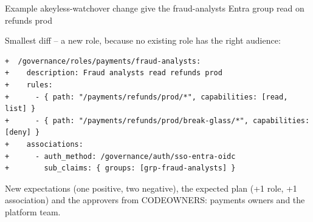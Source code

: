 \begin{session}{Example}
\you akeyless-watchover change give the fraud-analysts Entra group read on refunds prod

\agent Smallest diff -- a new role, because no existing role has the right audience:
\begin{lstlisting}
+  /governance/roles/payments/fraud-analysts:
+    description: Fraud analysts read refunds prod
+    rules:
+      - { path: "/payments/refunds/prod/*", capabilities: [read, list] }
+      - { path: "/payments/refunds/prod/break-glass/*", capabilities: [deny] }
+    associations:
+      - auth_method: /governance/auth/sso-entra-oidc
+        sub_claims: { groups: [grp-fraud-analysts] }
\end{lstlisting}
New expectations (one positive, two negative), the expected plan (+1 role, +1 association) and the
approvers from CODEOWNERS: payments owners and the platform team.
\end{session}
